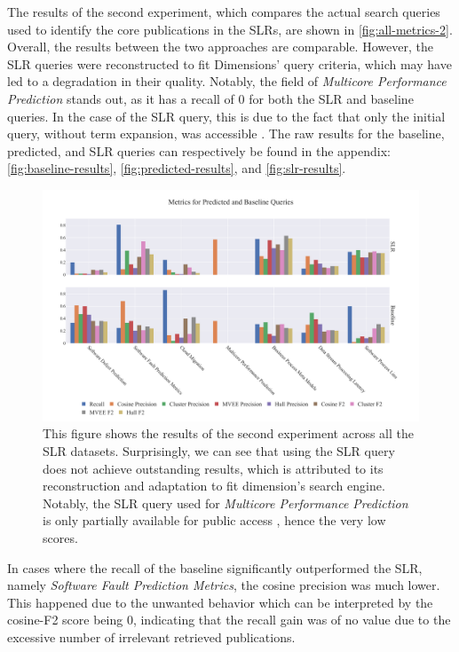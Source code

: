 The results of the second experiment, which compares the actual search queries used to identify the core publications in the SLRs, are shown in \autoref{fig:all-metrics-2}. Overall, the results between the two approaches are comparable. However, the SLR queries were reconstructed to fit Dimensions' query criteria, which may have led to a degradation in their quality. Notably, the field of \textit{Multicore Performance Prediction} stands out, as it has a recall of 0 for both the SLR and baseline queries. In the case of the SLR query, this is due to the fact that only the initial query, without term expansion, was accessible \autocite{Frank2017}. The raw results for the baseline, predicted, and SLR queries can respectively be found in the appendix: \autoref{fig:baseline-results}, \autoref{fig:predicted-results}, and \autoref{fig:slr-results}.  

\begin{figure}[!t]
	\hspace*{-.8cm}		
	\includegraphics[scale=0.45]{pics/all-metrics-2.pdf}
	\caption[Evaluation: Experiment 2]{This figure shows the results of the second experiment across all the SLR datasets. Surprisingly, we can see that using the SLR query does not achieve outstanding results, which is attributed to its reconstruction and adaptation to fit dimension's search engine. Notably, the SLR query used for \textit{Multicore Performance Prediction} is only partially available for public access \autocite{Frank2017}, hence the very low scores.}\label{fig:all-metrics-2}
\end{figure}

In cases where the recall of the baseline significantly outperformed the SLR, namely \textit{Software Fault Prediction Metrics}, the cosine precision was much lower. This happened due to the unwanted behavior which can be interpreted by the cosine-F2 score being 0, indicating that the recall gain was of no value due to the excessive number of irrelevant retrieved publications.

